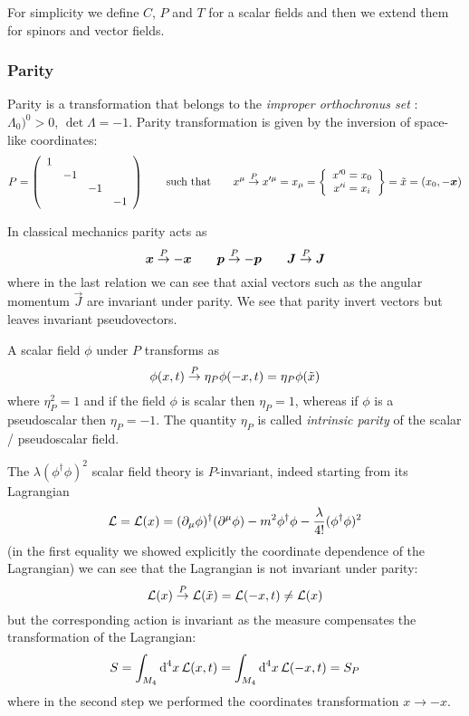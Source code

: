 \documentclass[TheoreticalPhy_ModB.tex]{subfiles}
\begin{document}
For simplicity we define $C$, $P$ and $T$ for a scalar fields and then we extend them for spinors and vector fields. 

\subsubsection{Parity}

Parity is a transformation that belongs to the \emph{improper orthochronus set }: ${\Lambda_0)}^0>0$, $\det\Lambda=-1$. Parity transformation is given by the inversion of space-like coordinates:
\[P=\left(\begin{array}{cccc}1 &  &  &  \\ & -1 &  &  \\ &  & -1 &  \\ &  &  & -1\end{array}\right)\qquad\text{such that}\qquad x^\mu\overset{P}{\to} x'^\mu=x_\mu=\left\{\begin{array}{c}x'^0=x_0 \\x'^i=x_i\end{array}\right\}=\tilde x=(x_0,-\boldsymbol x)\]

In classical mechanics parity acts as 
\[\boldsymbol x\overset{P}{\to}-\boldsymbol x\qquad\boldsymbol p\overset{P}{\to}-\boldsymbol p\qquad \boldsymbol J\overset{P}{\to}\boldsymbol J\]
where in the last relation we can see that axial vectors such as the angular momentum $\vec J$ are invariant under parity. We see that parity invert vectors but leaves invariant pseudovectors. 

A scalar field $\phi$ under $P$ transforms as 
\[\phi(x, t)\overset{P}{\to}\eta_P\phi(-x,t)=\eta_P\phi(\tilde x)\]
where $\eta_P^2=1$ and if the field $\phi$ is scalar then $\eta_P=1$, whereas if $\phi$ is a pseudoscalar then $\eta_P=-1$. The quantity $\eta_P$ is called \emph{intrinsic parity} of the scalar / pseudoscalar field. 

\begin{example}
The $\lambda(\phi^\dagger\phi)^2$ scalar field theory is $P$-invariant, indeed starting from its Lagrangian
\[\mathcal L=\mathcal L(x)=(\partial_{\mu}\phi)^\dagger(\partial^{\mu}\phi)-m^2\phi^\dagger\phi-\frac\lambda{4!}(\phi^\dagger\phi)^2\]
(in the first equality we showed explicitly the coordinate dependence of the Lagrangian) we can see that the Lagrangian is not invariant under parity:
\[\mathcal L(x)\overset{P}{\to}\mathcal L(\tilde x)=\mathcal L(-x,t)\neq\mathcal L(x)\]
but the corresponding action is invariant as the measure compensates the transformation of the Lagrangian:
\[S=\int_{M_4}\textup{d}^4x\,\mathcal L(x,t)=\int_{M_4}\textup{d}^4x\,\mathcal L(-x,t)=S_P\]
where in the second step we performed the coordinates transformation $x\to-x$.
\end{example}
\end{document}
